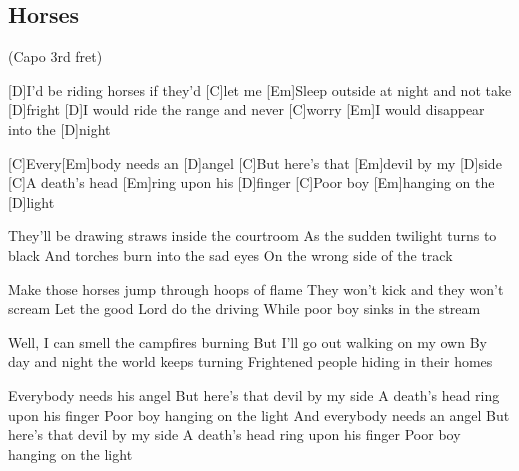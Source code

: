 \subsection*{Horses   }
\begin{guitar}
(Capo 3rd fret)

[D]I'd be riding horses if they'd [C]let me
[Em]Sleep outside at night and not take [D]fright
[D]I would ride the range and never [C]worry
[Em]I would disappear into the [D]night

[C]Every[Em]body needs an [D]angel
[C]But here's that [Em]devil by my [D]side
[C]A death's head [Em]ring upon his [D]finger
[C]Poor boy [Em]hanging on the [D]light

They'll be drawing straws inside the courtroom
As the sudden twilight turns to black
And torches burn into the sad eyes
On the wrong side of the track

Make those horses jump through hoops of flame
They won't kick and they won't scream
Let the good Lord do the driving
While poor boy sinks in the stream

Well, I can smell the campfires burning
But I'll go out walking on my own
By day and night the world keeps turning
Frightened people hiding in their homes

Everybody needs his angel
But here's that devil by my side
A death's head ring upon his finger
Poor boy hanging on the light
And everybody needs an angel
But here's that devil by my side
A death's head ring upon his finger
Poor boy hanging on the light
\end{guitar}
